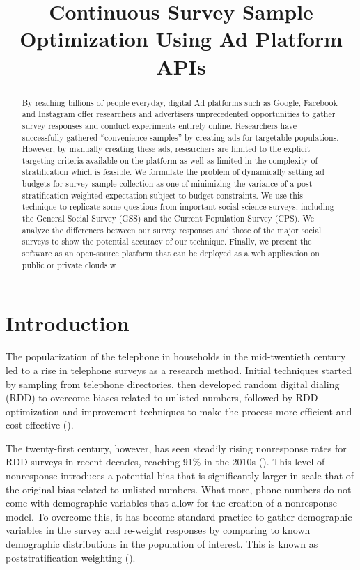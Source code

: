\documentclass[a4paper,12pt]{article}
\title{Continuous Survey Sample Optimization Using Ad Platform APIs}
\theoremstyle{proposition}
\begin{document}
\maketitle

\begin{abstract}
By reaching billions of people everyday, digital Ad platforms such as Google, Facebook and Instagram offer researchers and advertisers unprecedented opportunities to gather survey responses and conduct experiments entirely online. Researchers have successfully gathered “convenience samples” by creating ads for targetable populations. However, by manually creating these ads, researchers are limited to the explicit targeting criteria available on the platform as well as limited in the complexity of stratification which is feasible. We formulate the problem of dynamically setting ad budgets for survey sample collection as one of minimizing the variance of a post-stratification weighted expectation subject to budget constraints. We use this technique to replicate some questions from important social science surveys, including the General Social Survey (GSS) and the Current Population Survey (CPS). We analyze the differences between our survey responses and those of the major social surveys to show the potential accuracy of our technique. Finally, we present the software as an open-source platform that can be deployed as a web application on public or private clouds.w
\end{abstract}

\clearpage

\section{Introduction}

The popularization of the telephone in households in the mid-twentieth century led to a rise in telephone surveys as a research method. Initial techniques started by sampling from telephone directories, then developed random digital dialing (RDD) to overcome biases related to unlisted numbers, followed by RDD optimization and improvement techniques to make the process more efficient and cost effective (\cite{Cooper1964,Glasser1972,Sudman1973}).

The twenty-first century, however, has seen steadily rising nonresponse rates for RDD surveys in recent decades, reaching 91\% in the 2010s (\cite{Keeter2017,Shirani-Mehr2018}). This level of nonresponse introduces a potential bias that is significantly larger in scale that of the original bias related to unlisted numbers. What more, phone numbers do not come with demographic variables that allow for the creation of a nonresponse model. To overcome this, it has become standard practice to gather demographic variables in the survey and re-weight responses by comparing to known demographic distributions in the population of interest. This is known as poststratification weighting (\cite{Gelman1997}).
\end{document}
